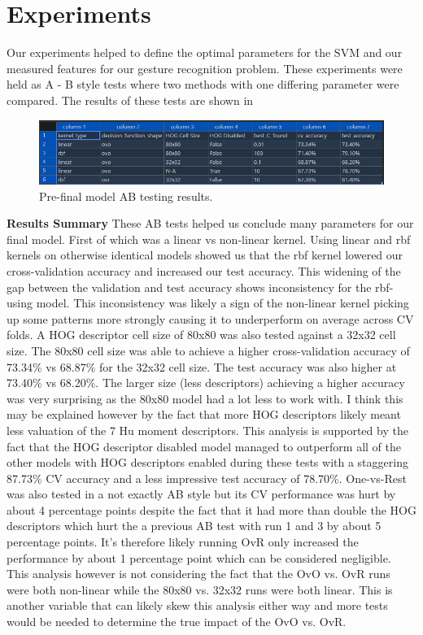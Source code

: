 \documentclass{article}
\begin{document}
\section{Experiments}
Our experiments helped to define the optimal parameters for the SVM and our measured features for our gesture recognition
problem. These experiments were held as A - B style tests where two methods with one differing parameter were compared. The results of these tests are shown in 

\begin{figure}[htb]
  \centering
  \includegraphics[width=\linewidth]{Testing-Results.png}
  \caption*{Pre-final model AB testing results.}
\end{figure}

\noindent\textbf{Results Summary} These AB tests helped us conclude many parameters for our final model. First of which was
a linear vs non-linear kernel. Using linear and rbf kernels on otherwise identical models showed us that
the rbf kernel lowered our cross-validation accuracy and increased our test accuracy. This widening of the gap between
the validation and test accuracy shows inconsistency for the rbf-using model. This inconsistency was likely a sign of the non-linear
kernel picking up some patterns more strongly causing it to underperform on average across CV folds.
A HOG descriptor cell size of 80x80 was also tested against a 32x32 cell size. The 80x80 cell size was able to achieve a higher
cross-validation accuracy of 73.34\% vs 68.87\% for the 32x32 cell size. The test accuracy was also higher at 73.40\% vs 68.20\%.
The larger size (less descriptors) achieving a higher accuracy was very surprising as the 80x80 model had a lot less to work with.
I think this may be explained however by the fact that more HOG descriptors likely meant less valuation of the 7 Hu moment descriptors.
This analysis is supported by the fact that the HOG descriptor disabled model managed to outperform all of the other models with HOG descriptors enabled
during these tests with a staggering 87.73\% CV accuracy and a less impressive test accuracy of 78.70\%.
One-vs-Rest was also tested in a not exactly AB style but its CV performance was hurt by about 4 percentage points
despite the fact that it had more than double the HOG descriptors which hurt the a previous AB test with run 1 and 3 by about 5 percentage points.
It's therefore likely running OvR only increased the performance by about 1 percentage point which can be considered negligible. This analysis however is
not considering the fact that the OvO vs. OvR runs were both non-linear while the 80x80 vs. 32x32 runs were both linear. This is another
variable that can likely skew this analysis either way and more tests would be needed to determine the true impact of the OvO vs. OvR.
\end{document}

